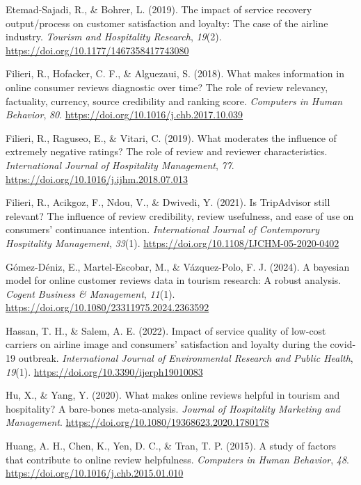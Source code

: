 \documentclass[
]{agujournal2019}
\newlength{\cslhangindent}
\newenvironment{CSLReferences}[2] %
 {\begin{list}{}{%
  \setlength{\itemindent}{0pt}
  \setlength{\leftmargin}{0pt}
  \setlength{\parsep}{0pt}
  \ifodd #1
   \setlength{\leftmargin}{\cslhangindent}
   \setlength{\itemindent}{-1\cslhangindent}
  \fi
  \setlength{\itemsep}{#2\baselineskip}}}
 {\end{list}}
\begin{document}
\begin{CSLReferences}{1}{0}
Etemad-Sajadi, R., \& Bohrer, L. (2019). The impact of service recovery
output/process on customer satisfaction and loyalty: The case of the
airline industry. \emph{Tourism and Hospitality Research}, \emph{19}(2).
\url{https://doi.org/10.1177/1467358417743080}

Filieri, R., Hofacker, C. F., \& Alguezaui, S. (2018). What makes
information in online consumer reviews diagnostic over time? The role of
review relevancy, factuality, currency, source credibility and ranking
score. \emph{Computers in Human Behavior}, \emph{80}.
\url{https://doi.org/10.1016/j.chb.2017.10.039}

Filieri, R., Raguseo, E., \& Vitari, C. (2019). What moderates the
influence of extremely negative ratings? The role of review and reviewer
characteristics. \emph{International Journal of Hospitality Management},
\emph{77}. \url{https://doi.org/10.1016/j.ijhm.2018.07.013}

Filieri, R., Acikgoz, F., Ndou, V., \& Dwivedi, Y. (2021). Is
TripAdvisor still relevant? The influence of review credibility, review
usefulness, and ease of use on consumers' continuance intention.
\emph{International Journal of Contemporary Hospitality Management},
\emph{33}(1). \url{https://doi.org/10.1108/IJCHM-05-2020-0402}

Gómez-Déniz, E., Martel-Escobar, M., \& Vázquez-Polo, F. J. (2024). A
bayesian model for online customer reviews data in tourism research: A
robust analysis. \emph{Cogent Business \& Management}, \emph{11}(1).
\url{https://doi.org/10.1080/23311975.2024.2363592}

Hassan, T. H., \& Salem, A. E. (2022). Impact of service quality of
low-cost carriers on airline image and consumers' satisfaction and
loyalty during the covid-19 outbreak. \emph{International Journal of
Environmental Research and Public Health}, \emph{19}(1).
\url{https://doi.org/10.3390/ijerph19010083}

Hu, X., \& Yang, Y. (2020). What makes online reviews helpful in tourism
and hospitality? A bare-bones meta-analysis. \emph{Journal of
Hospitality Marketing and Management}.
\url{https://doi.org/10.1080/19368623.2020.1780178}

Huang, A. H., Chen, K., Yen, D. C., \& Tran, T. P. (2015). A study of
factors that contribute to online review helpfulness. \emph{Computers in
Human Behavior}, \emph{48}.
\url{https://doi.org/10.1016/j.chb.2015.01.010}


\end{CSLReferences}
\end{document}
